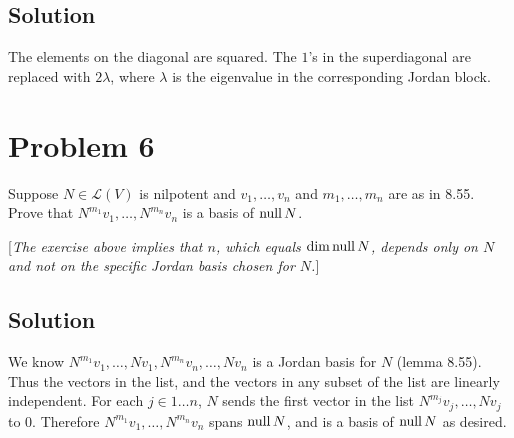 \documentclass{article}
\begin{document}
\subsection*{Solution}
The elements on the diagonal are squared. The $1$'s in the superdiagonal are replaced with $2\lambda$, where $\lambda$ is the eigenvalue in the corresponding Jordan block.

\section*{Problem 6}
Suppose $N\in\mathcal{L}(V)$ is nilpotent and $v_1,\ldots,v_n$ and $m_1,\ldots,m_n$ are as in 8.55. Prove that $N^{m_1}v_1,\ldots,N^{m_n}v_n$ is a basis of $\text{null}\, N$.

[\textit{The exercise above implies that $n$, which equals $\dim \text{null}\, N$, depends only on $N$ and not on the specific Jordan basis chosen for $N$.}]

\subsection*{Solution}
We know $N^{m_1}v_1,\ldots,N v_1,N^{m_n}v_n,\ldots,N v_n$
is a Jordan basis for $N$ (lemma 8.55). Thus the vectors in the list, and the vectors in any subset of the list are linearly independent. For each $j\in1\ldots n$, $N$ sends the first vector in the list $N^{m_j}v_j,\ldots,N v_j$ to $0$. Therefore $N^{m_1}v_1,\ldots,N^{m_n}v_n$ spans $\text{null}\, N$, and is a basis of $\text{null}\, N$ as desired.
\end{document}
